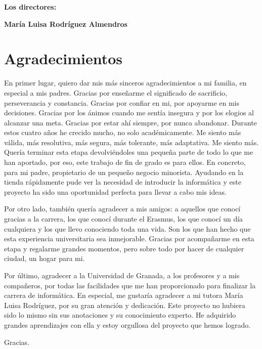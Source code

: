\vspace{1cm}

\textbf{Los directores:}

\vspace{5cm}

\noindent \textbf{María Luisa Rodríguez Almendros}

\chapter*{Agradecimientos}
\thispagestyle{empty}

       \vspace{1cm}


En primer lugar, quiero dar mis más sinceros agradecimientos a mi familia, en especial a mis padres. Gracias por enseñarme el significado de sacrificio, perseverancia y constancia. Gracias por confiar en mi, por apoyarme en mis decisiones. Gracias por los ánimos cuando me sentía insegura y por los elogios al alcanzar una meta. Gracias por estar ahí siempre, por nunca abandonar. Durante estos cuatro años he crecido mucho, no solo académicamente. Me siento más válida, más resolutiva, más segura, más tolerante, más adaptativa. Me siento más. Quería terminar esta etapa devolviéndoles una pequeña parte de todo lo que me han aportado, por eso, este trabajo de fin de grado es para ellos. En concreto, para mi padre, propietario de un pequeño negocio minorista. Ayudando en la tienda rápidamente pude ver la necesidad de introducir la informática y este proyecto ha sido una oportunidad perfecta para llevar a cabo mis ideas. 

\vspace{0.7cm}

Por otro lado, también quería agradecer a mis amigos: a aquellos que conocí gracias a la carrera, los que conocí durante el Erasmus, los que conocí un día cualquiera y los que llevo conociendo toda una vida. Son los que han hecho que esta experiencia universitaria sea inmejorable. Gracias por acompañarme en esta etapa y regalarme grandes momentos, pero sobre todo por hacer de cualquier ciudad, un hogar para mi.

\vspace{0.7cm}

Por último, agradecer a la Universidad de Granada, a los profesores y a mis compañeros, por todas las facilidades que me han proporcionado para finalizar la carrera de informática. En especial, me gustaría agradecer a mi tutora María Luisa Rodríguez, por su gran atención y dedicación. Este proyecto no hubiera sido lo mismo sin sus anotaciones y su conocimiento experto. He adquirido grandes aprendizajes con ella y estoy orgullosa del proyecto que hemos logrado. 

\vspace{0.7cm}

Gracias.






